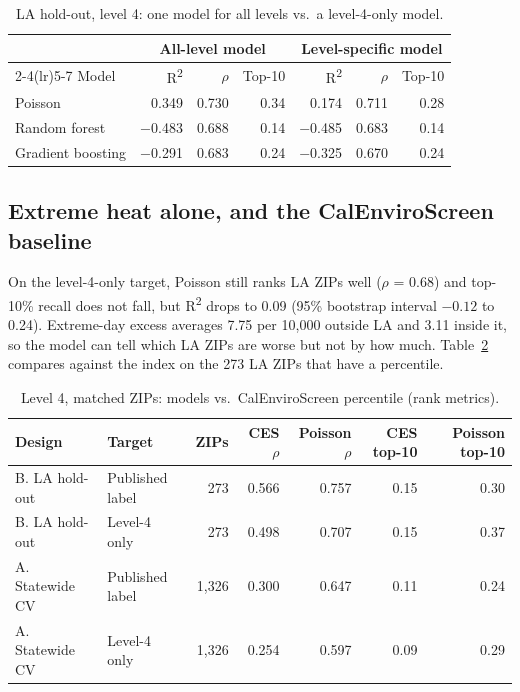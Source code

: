 \documentclass[10pt]{article}
\newcommand{\rhoS}{$\rho$}
\begin{document}
\begin{table}[!htbp]
\centering\small
\caption{LA hold-out, level 4: one model for all levels vs.\ a level-4-only model.}
\label{tab:levelspec}
\begin{tabular}{@{}lrrrrrr@{}}
\toprule
& \multicolumn{3}{c}{All-level model} & \multicolumn{3}{c}{Level-specific model} \\
\cmidrule(lr){2-4}\cmidrule(lr){5-7}
Model & R\textsuperscript{2} & \rhoS{} & Top-10 & R\textsuperscript{2} & \rhoS{} & Top-10 \\
\midrule
Poisson & 0.349 & 0.730 & 0.34 & 0.174 & 0.711 & 0.28 \\
Random forest & $-$0.483 & 0.688 & 0.14 & $-$0.485 & 0.683 & 0.14 \\
Gradient boosting & $-$0.291 & 0.683 & 0.24 & $-$0.325 & 0.670 & 0.24 \\
\bottomrule
\end{tabular}
\end{table}

\subsection{Extreme heat alone, and the CalEnviroScreen baseline}
On the level-4-only target, Poisson still ranks LA ZIPs well (\rhoS{} = 0.68) and top-10\% recall does not fall, but R\textsuperscript{2} drops to 0.09 (95\% bootstrap interval $-0.12$ to 0.24). Extreme-day excess averages 7.75 per 10,000 outside LA and 3.11 inside it, so the model can tell which LA ZIPs are worse but not by how much. Table~\ref{tab:ces} compares against the index on the 273 LA ZIPs that have a percentile.

\begin{table}[!htbp]
\centering\small
\caption{Level 4, matched ZIPs: models vs.\ CalEnviroScreen percentile (rank metrics).}
\label{tab:ces}
\begin{tabular}{@{}llrrrrr@{}}
\toprule
Design & Target & ZIPs & CES \rhoS{} & Poisson \rhoS{} & CES top-10 & Poisson top-10 \\
\midrule
B. LA hold-out & Published label & 273 & 0.566 & 0.757 & 0.15 & 0.30 \\
B. LA hold-out & Level-4 only & 273 & 0.498 & 0.707 & 0.15 & 0.37 \\
A. Statewide CV & Published label & 1,326 & 0.300 & 0.647 & 0.11 & 0.24 \\
A. Statewide CV & Level-4 only & 1,326 & 0.254 & 0.597 & 0.09 & 0.29 \\
\bottomrule
\end{tabular}
\end{table}
\end{document}
